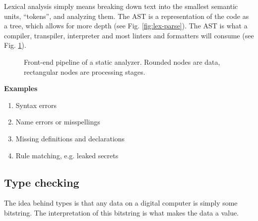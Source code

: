 \documentclass[conference]{IEEEtran}
\begin{document}
Lexical analysis simply means breaking down text into the smallest semantic units, ``tokens'', and analyzing them. The AST is a representation of the code as a tree, which allows for more depth (see Fig. \ref{fig:lex-parse}). The AST is what a compiler, transpiler, interpreter and most linters and formatters will consume (see Fig. \ref{fig:frontend-pipeline}).

\begin{figure}[t]
\centering
{}
\caption{Front-end pipeline of a static analyzer. \cite{aho2006compilers} Rounded nodes are data, rectangular nodes are processing stages.}
\label{fig:frontend-pipeline}
\end{figure}

\textbf{Examples}

\begin{enumerate}
    \item Syntax errors
    \item Name errors or misspellings
    \item Missing definitions and declarations
    \item Rule matching, e.g. leaked secrets
\end{enumerate}


\subsection{Type checking}

The idea behind types is that any data on a digital computer is simply some bitstring. The interpretation of this bitstring is what makes the data a value.
\end{document}
